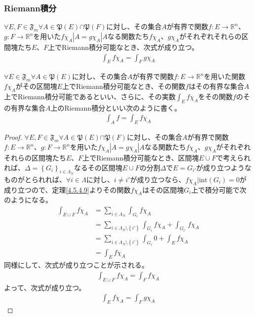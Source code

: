 \documentclass[dvipdfmx]{jsarticle}
\begin{document}
\subsubsection{Riemann積分}%
\begin{thm}\label{4.6.5.14}
$\forall E,F \in \mathfrak{F}_{m}\forall A \in \mathfrak{P}(E)\mathfrak{\cap P}(F)$に対し、その集合$A$が有界で関数$f:E \rightarrow \mathbb{R}^{n}$、$g:F \rightarrow \mathbb{R}^{n}$を用いた$f\chi_{A}|A = g\chi_{A}|A$なる関数たち$f\chi_{A}$、$g\chi_{A}$がそれぞれそれらの区間塊たち$E$、$F$上でRiemann積分可能なとき、次式が成り立つ。
\begin{align*}
\int_{E} {f\chi_{A}} = \int_{F} {g\chi_{A}}
\end{align*}
\end{thm}
\begin{dfn}
$\forall E \in \mathfrak{F}_{m}\forall A \in \mathfrak{P}(E)$に対し、その集合$A$が有界で関数$f:E \rightarrow \mathbb{R}^{n}$を用いた関数$f\chi_{A}$がその区間塊$E$上でRiemann積分可能なとき、その関数$f$はその有界な集合$A$上でRiemann積分可能であるといい、さらに、その実数$\int_{E} {f\chi_{A}}$をその関数$f$のその有界な集合$A$上のRiemann積分といい次のように書く。
\begin{align*}
\int_{A} f = \int_{E} {f\chi_{A}}
\end{align*}
\end{dfn}
\begin{proof}
$\forall E,F \in \mathfrak{F}_{m}\forall A \in \mathfrak{P}(E)\mathfrak{\cap P}(F)$に対し、その集合$A$が有界で関数$f:E \rightarrow \mathbb{R}^{n}$、$g:F \rightarrow \mathbb{R}^{n}$を用いた$f\chi_{A}|A = g\chi_{A}|A$なる関数たち$f\chi_{A}$、$g\chi_{A}$がそれぞれそれらの区間塊たち$E$、$F$上でRiemann積分可能なとき、区間塊$E \cup F$で考えられれば、$\varDelta = \left\{ G_{i} \right\}_{i \in \varLambda_{N}}$なるその区間塊$E \cup F$の分割$\varDelta$で$E = G_{i'}$が成り立つようなものがとられれば、$\forall i \in \varLambda$に対し、$i \neq i'$が成り立つなら、$f\chi_{A}|\mathrm{int}\left( G_{i} \right) = 0$が成り立つので、定理\ref{4.5.4.9}よりその関数$f\chi_{A}$はその区間塊$G_{i}$上で積分可能で次のようになる。
\begin{align*}
\int_{E \cup F} {f\chi_{A}} &= \sum_{i \in \varLambda_{N}} {\int_{G_{i}} {f\chi_{A}}} \\
&= \sum_{i \in \varLambda_{N} \setminus \left\{ i' \right\}} {\int_{G_{i}} {f\chi_{A}}} + \int_{G_{i'}} {f\chi_{A}} \\
&= \sum_{i \in \varLambda_{N} \setminus \left\{ i' \right\}} {\int_{G_{i}} 0} + \int_{E} {f\chi_{A}} \\
&= \int_{E} {f\chi_{A}}
\end{align*}
同様にして、次式が成り立つことが示される。
\begin{align*}
\int_{E \cup F} {f\chi_{A}} = \int_{F} {f\chi_{A}}
\end{align*}
よって、次式が成り立つ。
\begin{align*}
\int_{E} {f\chi_{A}} = \int_{F} {g\chi_{A}}
\end{align*}
\end{proof}
\end{document}

